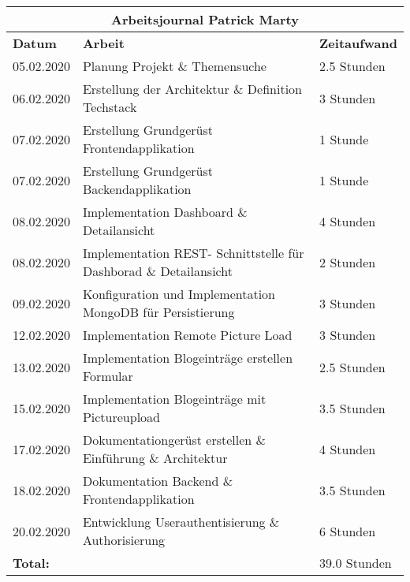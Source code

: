 \documentclass[../main.tex]{subfiles}
\begin{document}
\begin{tabular}{ |p{3cm}| p{11cm}| p{3cm} |}
 \hline
 \multicolumn{3}{|c|}{Arbeitsjournal Patrick Marty} \\
 \hline
 \textbf{Datum} & \textbf{Arbeit} & \textbf{Zeitaufwand}\\
 \hline
 05.02.2020 &   Planung Projekt \& Themensuche                       & 2.5 Stunden\\ \hline
 06.02.2020 &   Erstellung der Architektur \& Definition Techstack  & 3 Stunden \\ \hline
 07.02.2020 &   Erstellung Grundgerüst Frontendapplikation          & 1 Stunde \\ \hline
 07.02.2020 &   Erstellung Grundgerüst Backendapplikation           & 1 Stunde \\ \hline
 08.02.2020 &   Implementation Dashboard \& Detailansicht           & 4 Stunden \\ \hline
 08.02.2020 &   Implementation REST- Schnittstelle für Dashborad \& Detailansicht & 2 Stunden \\ \hline
 09.02.2020 &   Konfiguration und Implementation MongoDB für Persistierung  & 3 Stunden \\ \hline
 12.02.2020 &   Implementation Remote Picture Load                  & 3 Stunden \\ \hline 
 13.02.2020 &   Implementation Blogeinträge erstellen Formular      & 2.5 Stunden \\ \hline
 15.02.2020 &   Implementation Blogeinträge mit Pictureupload       & 3.5 Stunden \\ \hline
 17.02.2020 &   Dokumentationgerüst erstellen \& Einführung \& Architektur  & 4 Stunden \\ \hline
 18.02.2020 &   Dokumentation Backend \& Frontendapplikation                & 3.5 Stunden \\ \hline
 20.02.2020 &   Entwicklung Userauthentisierung \& Authorisierung           & 6 Stunden \\ \hline
 \hline
 \textbf{Total:} & & 39.0 Stunden \\ \hline
 
\end{tabular}
\end{document}
